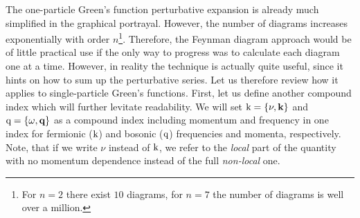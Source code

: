 \documentclass[../../main.tex]{subfiles}
\begin{document}
The one-particle Green's function perturbative expansion is already much simplified in the graphical portrayal. However, the number of diagrams increases exponentially with order $n$\footnote{For $n=2$ there exist $10$ diagrams, for $n=7$ the number of diagrams is well over a million.}. Therefore, the Feynman diagram approach would be of little practical use if the only way to progress was to calculate each diagram one at a time. However, in reality the technique is actually quite useful, since it hints on how to sum up the perturbative series. Let us therefore review how it applies to single-particle Green's functions. First, let us define another compound index which will further levitate readability. We will set $\text{k}=\{\nu,\textbf{k}\}$ and $\text{q}=\{\omega, \textbf{q}\}$ as a compound index including momentum and frequency in one index for fermionic ($\text{k}$) and bosonic ($\text{q}$) frequencies and momenta, respectively. Note, that if we write $\nu$ instead of $\text{k}$, we refer to the \textit{local} part of the quantity with no momentum dependence instead of the full \textit{non-local} one.
\end{document}
